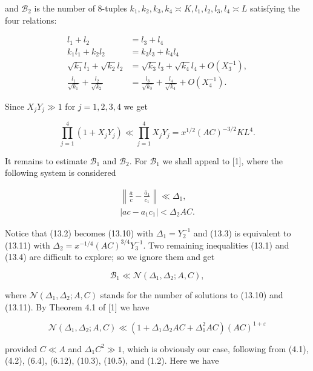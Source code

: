 \documentclass[10pt]{article}
\begin{document}
and $\mathscr{B}_{2}$ is the number of 8-tuples $k_{1}, k_{2}, k_{3}, k_{4} \asymp K, l_{1}, l_{2}, l_{3}, l_{4} \asymp L$ satisfying the four relations:


\begin{align*}
l_{1}+l_{2} & =l_{3}+l_{4}  \tag{13.5}\\
k_{1} l_{1}+k_{2} l_{2} & =k_{3} l_{3}+k_{4} l_{4}  \tag{13.6}\\
\sqrt{k_{1}} l_{1}+\sqrt{k_{2}} l_{2} & =\sqrt{k_{3}} l_{3}+\sqrt{k_{4}} l_{4}+O\left(X_{3}^{-1}\right),  \tag{13.7}\\
\frac{l_{1}}{\sqrt{k_{1}}}+\frac{l_{2}}{\sqrt{k_{2}}} & =\frac{l_{3}}{\sqrt{k_{3}}}+\frac{l_{4}}{\sqrt{k_{4}}}+O\left(X_{4}^{-1}\right) . \tag{13.8}
\end{align*}


Since $X_{j} Y_{j} \gg 1$ for $j=1,2,3,4$ we get


\begin{equation*}
\prod_{j=1}^{4}\left(1+X_{j} Y_{j}\right) \ll \prod_{j=1}^{4} X_{j} Y_{j}=x^{1 / 2}(A C)^{-3 / 2} K L^{4} . \tag{13.9}
\end{equation*}


It remains to estimate $\mathscr{B}_{1}$ and $\mathscr{B}_{2}$. For $\mathscr{B}_{1}$ we shall appeal to [1], where the following system is considered


\begin{gather*}
\left\|\frac{\bar a}{c}-\frac{\bar a_{1}}{c_{1}}\right\|\ll\Delta_{1},  \tag{13.10}\\
\left|a c-a_{1} c_{1}\right|<\Delta_{2} A C . \tag{13.11}
\end{gather*}


Notice that (13.2) becomes (13.10) with $\Delta_{1}=Y_{2}^{-1}$ and (13.3) is equivalent to (13.11) with $\Delta_{2}=x^{-1 / 4}(A C)^{3 / 4} Y_{3}^{-1}$. Two remaining inequalities (13.1) and (13.4) are difficult to explore; so we ignore them and get

$$
\mathscr{B}_{1}\ll\mathcal{N}(\Delta_{1},\Delta_{2};A,C),
$$

where $\mathcal{N}(\Delta_{1},\Delta_{2};A,C)$ stands for the number of solutions to (13.10) and (13.11). By Theorem 4.1 of [1] we have

$$
\mathcal{N}\left(\Delta_{1}, \Delta_{2} ; A, C\right) \ll\left(1+\Delta_{1}\Delta_{2}AC+\Delta_{1}^{2}AC\right)(A C)^{1+\varepsilon}
$$

provided $C \ll A$ and $\Delta_{1} C^{2} \gg 1$, which is obviously our case, following from (4.1), (4.2), (6.4), (6.12), (10.3), (10.5), and (1.2). Here we have
\end{document}
